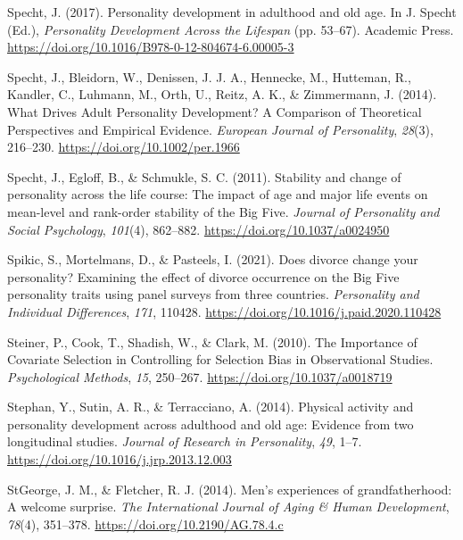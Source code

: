 \documentclass[
  english,
  man, noextraspace]{apa7}
\begin{document}
\leavevmode\hypertarget{ref-spechtPersonalityDevelopmentAdulthood2017}{}%
Specht, J. (2017). Personality development in adulthood and old age. In J. Specht (Ed.), \emph{Personality Development Across the Lifespan} (pp. 53--67). Academic Press. \url{https://doi.org/10.1016/B978-0-12-804674-6.00005-3}

\leavevmode\hypertarget{ref-spechtWhatDrivesAdult2014}{}%
Specht, J., Bleidorn, W., Denissen, J. J. A., Hennecke, M., Hutteman, R., Kandler, C., Luhmann, M., Orth, U., Reitz, A. K., \& Zimmermann, J. (2014). What Drives Adult Personality Development? A Comparison of Theoretical Perspectives and Empirical Evidence. \emph{European Journal of Personality}, \emph{28}(3), 216--230. \url{https://doi.org/10.1002/per.1966}

\leavevmode\hypertarget{ref-spechtStabilityChangePersonality2011}{}%
Specht, J., Egloff, B., \& Schmukle, S. C. (2011). Stability and change of personality across the life course: The impact of age and major life events on mean-level and rank-order stability of the Big Five. \emph{Journal of Personality and Social Psychology}, \emph{101}(4), 862--882. \url{https://doi.org/10.1037/a0024950}

\leavevmode\hypertarget{ref-spikicDoesDivorceChange2021}{}%
Spikic, S., Mortelmans, D., \& Pasteels, I. (2021). Does divorce change your personality? Examining the effect of divorce occurrence on the Big Five personality traits using panel surveys from three countries. \emph{Personality and Individual Differences}, \emph{171}, 110428. \url{https://doi.org/10.1016/j.paid.2020.110428}

\leavevmode\hypertarget{ref-steinerImportanceCovariateSelection2010}{}%
Steiner, P., Cook, T., Shadish, W., \& Clark, M. (2010). The Importance of Covariate Selection in Controlling for Selection Bias in Observational Studies. \emph{Psychological Methods}, \emph{15}, 250--267. \url{https://doi.org/10.1037/a0018719}

\leavevmode\hypertarget{ref-stephanPhysicalActivityPersonality2014}{}%
Stephan, Y., Sutin, A. R., \& Terracciano, A. (2014). Physical activity and personality development across adulthood and old age: Evidence from two longitudinal studies. \emph{Journal of Research in Personality}, \emph{49}, 1--7. \url{https://doi.org/10.1016/j.jrp.2013.12.003}

\leavevmode\hypertarget{ref-stgeorgeMenExperiencesGrandfatherhood2014}{}%
StGeorge, J. M., \& Fletcher, R. J. (2014). Men's experiences of grandfatherhood: A welcome surprise. \emph{The International Journal of Aging \& Human Development}, \emph{78}(4), 351--378. \url{https://doi.org/10.2190/AG.78.4.c}
\end{document}
